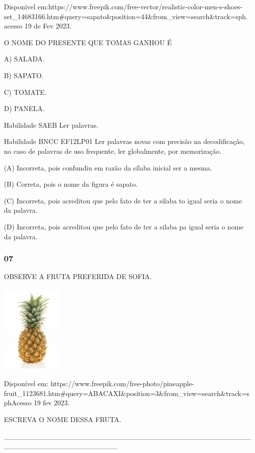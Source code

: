 \begin{escola}
Disponivel
em:https://www.freepik.com/free-vector/realistic-color-men-s-shoes-set\_14683166.htm\#query=sapato\&position=44\&from\_view=search\&track=sph.acesso
19 de Fev 2023.

O NOME DO PRESENTE QUE TOMAS GANHOU É

A) SALADA.

B) SAPATO.

C) TOMATE.

D) PANELA.

Habilidade SAEB Ler palavras.

Habilidade BNCC EF12LP01 Ler palavras novas com precisão na
decodificação, no caso de palavras de uso frequente, ler globalmente,
por memorização.

(A) Incorreta, pois confundiu em razão da sílaba inicial ser a mesma.

(B) Correta, pois o nome da figura é sapato.

\protect\hypertarget{_heading=h.vx1227}{}{}
(C) Incorreta, pois acreditou que pelo fato de ter a silaba to igual seria o nome da palavra.

(D) Incorreta, pois acreditou que pelo fato de ter a silaba pa igual
seria o nome da
palavra.\protect\hypertarget{_heading=h.bdexdhbfzr3s}{}{}

\subsubsection{07}\label{section-32}

OBSERVE A FRUTA PREFERIDA DE SOFIA.

\includegraphics[width=1.15208in,height=1.72708in]{media/image192.jpg}

Disponível
em: https://www.freepik.com/free-photo/pineapple-fruit\_1123681.htm\#query=ABACAXI\&position=3\&from\_view=search\&track=sphAcesso
19 fev 2023.

ESCREVA O NOME DESSA FRUTA.

\_\_\_\_\_\_\_\_\_\_\_\_\_\_\_\_\_\_\_\_\_\_\_\_\_\_\_\_\_\_\_\_\_\_\_\_\_\_\_\_\_\_\_\_\_\_\_\_\_\_\_\_\_\_\_\_\_\_\_\_\_\_\_\_\_\_\_\_\_\_


\end{escola}

